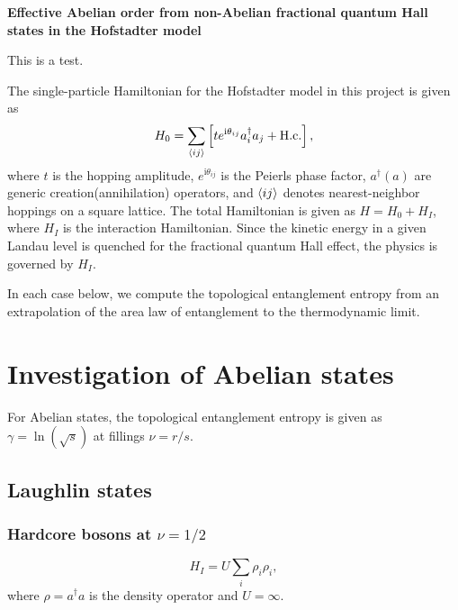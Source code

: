 \documentclass[floatfix,showpacs,amsmath,amsfonts,amssymb,aps,twocolumn, prb,groupedaddress]{revtex4-1}
\begin{document}
\onecolumngrid

\begin{center}
	\textbf{\large Effective Abelian order from non-Abelian fractional quantum Hall states in the Hofstadter model}
\end{center}
\vspace{-1em}
\tableofcontents
\vspace{1em}

This is a test.

The single-particle Hamiltonian for the Hofstadter model in this project is given as
\begin{equation}
\label{eq:single_ham}
H_0 = \sum_{\braket{ij}} \left[ t e^{\mathrm{i}\theta_{ij}} a_i^\dagger a_j + \text{H.c.} \right],
\end{equation}
where $t$ is the hopping amplitude, $e^{\mathrm{i}\theta_{ij}}$ is the Peierls phase factor, $a^\dagger(a)$ are generic creation(annihilation) operators, and $\braket{ij}$ denotes nearest-neighbor hoppings on a square lattice. The total Hamiltonian is given as $H=H_0+H_I$, where $H_I$ is the interaction Hamiltonian. Since the kinetic energy in a given Landau level is quenched for the fractional quantum Hall effect, the physics is governed by $H_I$.

In each case below, we compute the topological entanglement entropy from an extrapolation of the area law of entanglement to the thermodynamic limit.

\section{Investigation of Abelian states}

For Abelian states, the topological entanglement entropy is given as $\gamma=\ln(\sqrt{s})$ at fillings $\nu=r/s$.~\cite{Estienne15}

\subsection{Laughlin states}

\subsubsection{Hardcore bosons at $\nu=1/2$}

\begin{equation}
H_I = U \sum_i \rho_i \rho_i,
\end{equation}
where $\rho=a^\dagger a$ is the density operator and $U=\infty$.
\end{document}
